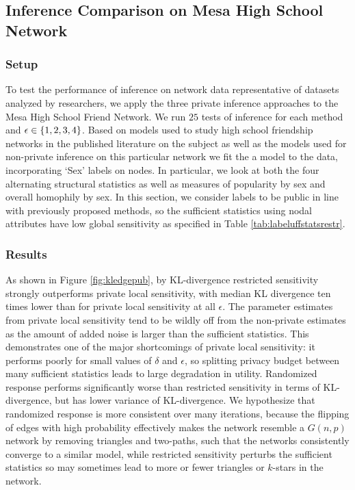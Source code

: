   \subsection{Inference Comparison on Mesa High School Network}
  
 \subsubsection{Setup}
 
 To test the performance of inference on network data representative of datasets analyzed by researchers, we apply the three private inference approaches to the Mesa High School Friend Network. We run $25$ tests of inference for each method and $\epsilon \in \{1,2,3,4\}$. Based on models used to study high school friendship networks in the published literature on the subject \cite{GKM09} as well as the models used for non-private inference on this particular network \cite{ergm} we fit the a model to the data, incorporating `Sex' labels on nodes. In particular, we look at both the four alternating structural statistics as well as measures of popularity by sex and overall homophily by sex. In this section, we consider labels to be public in line with previously proposed methods, so the sufficient statistics using nodal attributes have low global sensitivity as specified in Table \ref{tab:labeluffstatsrestr}.
 
  \subsubsection{Results}
  
  
  As shown in Figure \ref{fig:kledgepub}, by KL-divergence restricted sensitivity strongly outperforms private local sensitivity, with median KL divergence ten times lower than for private local sensitivity at all $\epsilon$. The parameter estimates from private local sensitivity tend to be wildly off from the non-private estimates as the amount of added noise is larger than the sufficient statistics. This demonstrates one of the major shortcomings of private local sensitivity: it performs poorly for small values of $\delta$ and $\epsilon$, so splitting privacy budget between many sufficient statistics leads to large degradation in utility. Randomized response performs significantly worse than restricted sensitivity in terms of KL-divergence, but has lower variance of KL-divergence. We hypothesize that randomized response is more consistent over many iterations, because the flipping of edges with high probability effectively makes the network resemble a $G(n,p)$ network by removing triangles and two-paths, such that the networks consistently converge to a similar model, while restricted sensitivity perturbs the sufficient statistics so may sometimes lead to more or fewer triangles or $k$-stars in the network. 
  
